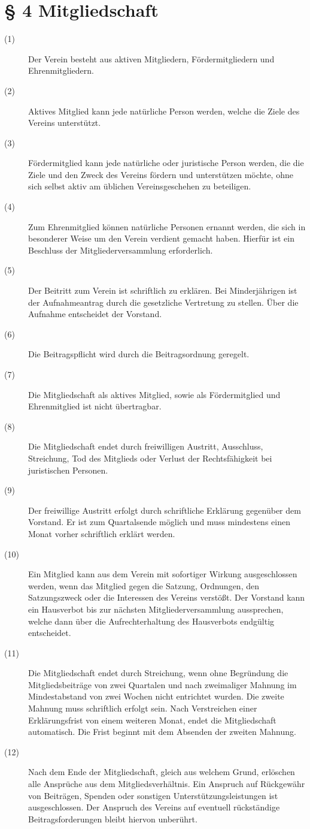 \documentclass[a4paper,12pt]{scrartcl}
\begin{document}
\section*{\S{} 4 Mitgliedschaft}
\begin{description} 

\item[(1)] Der Verein besteht aus aktiven Mitgliedern, Fördermitgliedern und Ehrenmitgliedern.
\item[(2)] Aktives Mitglied kann jede natürliche Person werden, welche die Ziele des Vereins unterstützt.
\item[(3)] Fördermitglied kann jede natürliche oder juristische Person werden, die die Ziele und den Zweck des Vereins fördern und unterstützen möchte, ohne sich selbst aktiv am üblichen Vereinsgeschehen zu beteiligen.
\item[(4)] Zum Ehrenmitglied können natürliche Personen ernannt werden, die sich in besonderer Weise um den Verein verdient gemacht haben. Hierfür ist ein Beschluss der Mitgliederversammlung erforderlich.
\item[(5)] Der Beitritt zum Verein ist schriftlich zu erklären. Bei Minderjährigen ist der Aufnahmeantrag durch die gesetzliche Vertretung zu stellen. Über die Aufnahme entscheidet der Vorstand.
\item[(6)] Die Beitragspflicht wird durch die Beitragsordnung geregelt.
\item[(7)] Die Mitgliedschaft als aktives Mitglied, sowie als Fördermitglied und Ehrenmitglied ist nicht übertragbar. 
\item[(8)] Die Mitgliedschaft endet durch freiwilligen Austritt, Ausschluss, Streichung, Tod des Mitglieds oder Verlust der Rechtsfähigkeit bei juristischen Personen. 
\item[(9)] Der freiwillige Austritt erfolgt durch schriftliche Erklärung gegenüber dem Vorstand. Er ist zum Quartalsende möglich und muss mindestens einen Monat vorher schriftlich erklärt werden. 
\item[(10)] Ein Mitglied kann aus dem Verein mit sofortiger Wirkung ausgeschlossen werden, wenn das Mitglied gegen die Satzung, Ordnungen, den Satzungszweck oder die Interessen des Vereins verstößt. Der Vorstand kann ein Hausverbot bis zur nächsten Mitgliederversammlung aussprechen, welche dann über die Aufrechterhaltung des Hausverbots endgültig entscheidet. 
\item[(11)] Die Mitgliedschaft endet durch Streichung, wenn ohne Begründung die Mitgliedsbeiträge von zwei Quartalen und nach zweimaliger Mahnung im Mindestabstand von zwei Wochen nicht entrichtet wurden. Die zweite Mahnung muss schriftlich erfolgt sein. Nach Verstreichen einer Erklärungsfrist von einem weiteren Monat, endet die Mitgliedschaft automatisch. Die Frist beginnt mit dem Absenden der zweiten Mahnung. 
\item[(12)] Nach dem Ende der Mitgliedschaft, gleich aus welchem Grund, erlöschen alle Ansprüche aus dem Mitgliedsverhältnis. Ein Anspruch auf Rückgewähr von Beiträgen, Spenden oder sonstigen Unterstützungsleistungen ist ausgeschlossen. Der Anspruch des Vereins auf eventuell rückständige Beitragsforderungen bleibt hiervon unberührt.


\end{description}
\end{document}
